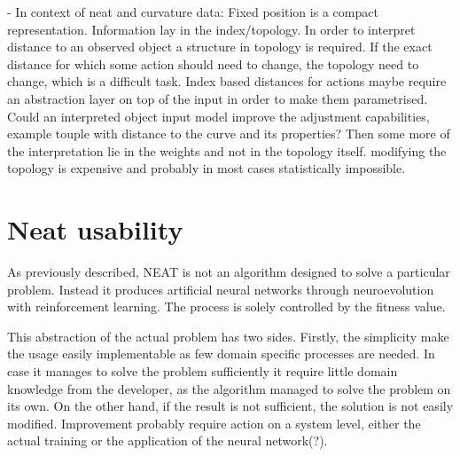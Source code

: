 - In context of neat and curvature data: Fixed position is a compact representation. Information lay in the index/topology. In order to interpret distance to an observed object a structure in topology is required. If the exact distance for which some action should need to change, the topology need to change, which is a difficult task. Index based distances for actions maybe require an abstraction layer on top of the input in order to make them parametrised. Could an interpreted object input model improve the adjustment capabilities, example touple with distance to the curve and its properties? Then some more of the interpretation lie in the weights and not in the topology itself. modifying the topology is expensive and probably in most cases statistically impossible.


\section{Neat usability}

As previously described, NEAT is not an algorithm designed to solve a particular problem. Instead it produces artificial neural networks through neuroevolution with reinforcement learning. The process is solely controlled by the fitness value.

This abstraction of the actual problem has two sides. Firstly, the simplicity make the usage easily implementable as few domain specific processes are needed. In case it manages to solve the problem sufficiently it require little domain knowledge from the developer, as the algorithm managed to solve the problem on its own. On the other hand, if the result is not sufficient, the solution is not easily modified. Improvement probably require action on a system level, either the actual training or the application of the neural network(?).

